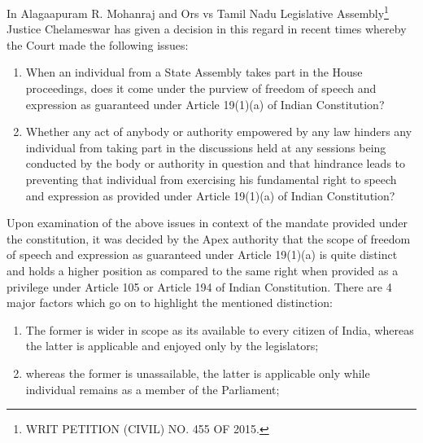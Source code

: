 \begin{multicols}{2}
\vspace{-.1cm}

\noi
In Alagaapuram R. Mohanraj and Ors vs Tamil Nadu Legislative Assembly\footnote{WRIT PETITION (CIVIL) NO. 455 OF 2015.} Justice Chelameswar has given a decision in this regard in recent times whereby the Court made the following issues:

\vspace{-.3cm}

\begin{enumerate}
\itemsep=0pt
\item When an individual from a State Assembly takes part in the House proceedings,
does it come under the purview of freedom of speech and expression as guaranteed
under Article 19(1)(a) of Indian Constitution?

\item Whether any act of anybody or authority empowered by any law hinders any
individual from taking part in the discussions held at any sessions being conducted
by the body or authority in question and that hindrance leads to preventing that
individual from exercising his fundamental right to speech and expression as
provided under Article 19(1)(a) of Indian Constitution?
\end{enumerate}


\vspace{-.3cm}

\noi
Upon examination of the above issues in context of the mandate provided under the
constitution, it was decided by the Apex authority that the scope of freedom of speech and
expression as guaranteed under Article 19(1)(a) is quite distinct and holds a higher position as
compared to the same right when provided as a privilege under Article 105 or Article 194 of
Indian Constitution. There are 4 major factors which go on to highlight the mentioned
distinction:

\vspace{-.3cm}

\begin{enumerate}[label=$\bullet$]
\itemsep=0pt
\item The former is wider in scope as its available to every citizen of India, whereas the
latter is applicable and enjoyed only by the legislators;

\item  whereas the former is unassailable, the latter is applicable only while individual
remains as a member of the Parliament;


\end{enumerate}
\end{multicols}
